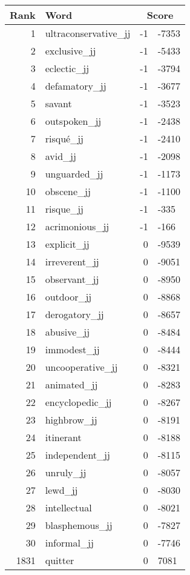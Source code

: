 \begin{longtable}[!htbp]{| rlr@{.}l |}
    \hline
    \textbf{Rank} & \textbf{Word} & \multicolumn{2}{c|}{\textbf{Score}} \\
    \hline
    \endhead
    1 & ultraconservative\_jj & -1 & -7353 \\
    2 & exclusive\_jj & -1 & -5433 \\
    3 & eclectic\_jj & -1 & -3794 \\
    4 & defamatory\_jj & -1 & -3677 \\
    5 & savant & -1 & -3523 \\
    6 & outspoken\_jj & -1 & -2438 \\
    7 & risqué\_jj & -1 & -2410 \\
    8 & avid\_jj & -1 & -2098 \\
    9 & unguarded\_jj & -1 & -1173 \\
    10 & obscene\_jj & -1 & -1100 \\
    11 & risque\_jj & -1 & -335 \\
    12 & acrimonious\_jj & -1 & -166 \\
    13 & explicit\_jj & 0 & -9539 \\
    14 & irreverent\_jj & 0 & -9051 \\
    15 & observant\_jj & 0 & -8950 \\
    16 & outdoor\_jj & 0 & -8868 \\
    17 & derogatory\_jj & 0 & -8657 \\
    18 & abusive\_jj & 0 & -8484 \\
    19 & immodest\_jj & 0 & -8444 \\
    20 & uncooperative\_jj & 0 & -8321 \\
    21 & animated\_jj & 0 & -8283 \\
    22 & encyclopedic\_jj & 0 & -8267 \\
    23 & highbrow\_jj & 0 & -8191 \\
    24 & itinerant & 0 & -8188 \\
    25 & independent\_jj & 0 & -8115 \\
    26 & unruly\_jj & 0 & -8057 \\
    27 & lewd\_jj & 0 & -8030 \\
    28 & intellectual & 0 & -8021 \\
    29 & blasphemous\_jj & 0 & -7827 \\
    30 & informal\_jj & 0 & -7746 \\
    1831 & quitter & 0 & 7081 \\

\end{longtable}
